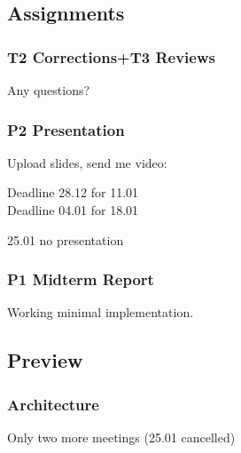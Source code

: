 \breakframe

\subsection{Assignments}

\begin{frame}
	\frametitle{T2 Corrections+T3 Reviews}

	\begin{task}
	Any questions?
	\end{task}
\end{frame}

\begin{frame}
	\frametitle{P2 Presentation}

	Upload slides, send me video:

	\begin{task}
	Deadline 28.12 for 11.01 \\
	Deadline 04.01 for 18.01
	\end{task}

	25.01 no presentation
\end{frame}

\begin{frame}
	\frametitle{P1 Midterm Report}

	\begin{task}
	Working minimal implementation.
	\end{task}
\end{frame}

%

\subsection{Preview}

\begin{frame}
	\frametitle{Architecture}

	Only two more meetings (25.01 cancelled)
\end{frame}


%
%	
%	





